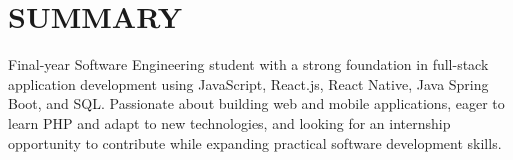 \section{SUMMARY}
\small
\noindent Final-year Software Engineering student with a strong foundation in full-stack application development using JavaScript, React.js, React Native, Java Spring Boot, and SQL. Passionate about building web and mobile applications, eager to learn PHP and adapt to new technologies, and looking for an internship opportunity to contribute while expanding practical software development skills.

\normalsize